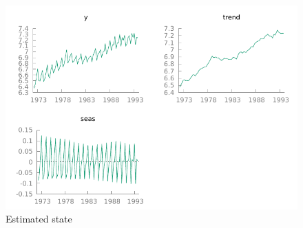\documentclass[a4paper]{article}
\begin{document}
\begin{figure}[hb]
  \centering
  \includegraphics[scale=0.7]{rw+seas}
  \caption{Estimated state}\label{fig:rw+seas}
\end{figure}
\end{document}
